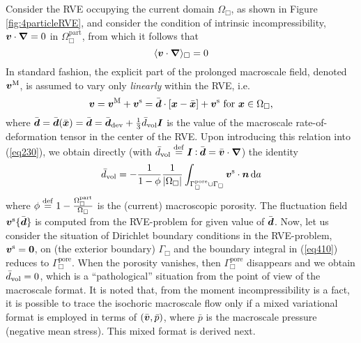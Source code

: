 \documentclass[10pt,a4paper]{article}
\newcommand{\pore}{\mathrm{pore}}
\newcommand{\particle}{\mathrm{part}}
\begin{document}
Consider the RVE occupying the current domain $\Omega_\Box$, as shown in Figure \ref{fig:4particleRVE}, and consider the condition of intrinsic incompressibility, $\boldsymbol{v}\cdot\boldsymbol{\nabla}=0$ in $\Omega_\Box^\particle$, from which it follows that
\begin{equation}
    \langle \boldsymbol{v}\cdot\boldsymbol{\nabla} \rangle_\Box  = 0
\label{eq230}
\end{equation}
In standard fashion, the explicit part of the prolonged macroscale field, denoted $\boldsymbol{v}^{\mathrm{M}}$, is assumed to vary only \emph{linearly} within the RVE, i.e.
\begin{equation}
    \boldsymbol{v} = \boldsymbol{v}^{\mathrm{M}} + \boldsymbol{v}^{\mathrm{s}} =
    \bar{\boldsymbol{d}} \cdot [\boldsymbol{x}-\bar{\boldsymbol{x}}] + \boldsymbol{v}^{\mathrm{s}} \mbox{ for }\boldsymbol{x}\in\Omega_\Box,
    \label{eq409}
\end{equation}
where $\bar{\boldsymbol{d}}=\bar{\boldsymbol{d}}(\bar{\boldsymbol{x}})=\bar{\boldsymbol{d}}=\bar{\boldsymbol{d}}_{\mathrm{dev}}+\frac{1}{3}\bar{d}_{\mathrm{vol}}\boldsymbol{I}$ is the value of the macroscale rate-of-deformation tensor in the center of the RVE. Upon introducing this relation into (\ref{eq230}), we obtain directly (with $\bar{d}_{\mathrm{vol}}\overset{\mathrm{def}}{=}\boldsymbol{I}\mathbin{\vcentcolon}\bar{\boldsymbol{d}}=\bar{\boldsymbol{v}}\cdot\boldsymbol{\nabla}$) the identity
\begin{equation}
    \bar{d}_\vol = - \frac{1}{1-\phi}\frac{1}{|\Omega_\Box|}\int_{\Gamma_\Box^\pore\cup\Gamma_\Box} \ta{v}^\fluct\cdot\ta{n} \dif a
    \label{eq410}
\end{equation}
where $\phi\defeq 1-\frac{\Omega_\Box^\particle}{\Omega_\Box}$ is the (current) macroscopic porosity. The fluctuation field $\boldsymbol{v}^{\mathrm{s}}\{\bar{\boldsymbol{d}}\}$ is computed from the RVE-problem for given value of $\bar{\boldsymbol{d}}$. Now, let us consider the situation of Dirichlet boundary conditions in the RVE-problem, $\boldsymbol{v}^{\mathrm{s}}=\boldsymbol{0}$, on (the exterior boundary) $\Gamma_\Box$ and the boundary integral in (\ref{eq410}) reduces to $\Gamma_\Box^\pore$. When the porosity vanishes, then $\Gamma_\Box^\pore$ disappears and we obtain $\bar{d}_{\mathrm{vol}} = 0$, which is a ``pathological'' situation from the point of view of the macroscale format. It is noted that, from the moment incompressibility is a fact, it is possible to trace the isochoric macroscale flow only if a mixed variational format is employed in terms of $(\bar{\boldsymbol{v}},\bar{p})$, where $\bar{p}$ is the macroscale pressure (negative mean stress). This mixed format is derived next.
\end{document}
